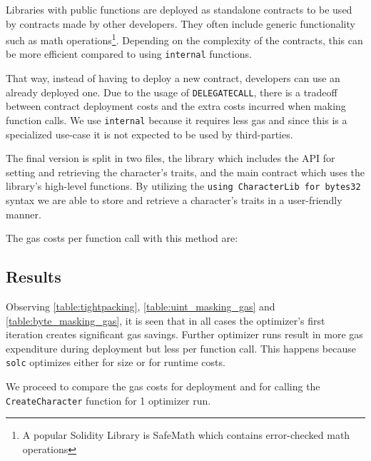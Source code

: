 
Libraries with public functions are deployed as standalone contracts to be used by contracts made by other developers. They often include generic functionality such as math operations\footnote{A popular Solidity Library is SafeMath which contains error-checked math operations}. Depending on the complexity of the contracts, this can be more efficient compared to using \texttt{internal} functions. %

That way, instead of having to deploy a new contract, developers can use an already deployed one. Due to the usage of \texttt{DELEGATECALL}, there is a tradeoff between contract deployment costs and the extra costs incurred when making function calls. We use \texttt{internal} because it requires less gas and since this is a specialized use-case it is not expected to be used by third-parties.

The final version is split in two files, the library which includes the API for setting and retrieving the character's traits, and the main contract which uses the library's high-level functions. By utilizing the \texttt{using CharacterLib for bytes32} syntax we are able to store and retrieve a character's traits in a user-friendly manner.

The gas costs per function call with this method are: 


\subsection{Results}\label{ch:scalability:results}
Observing \ref{table:tightpacking}, \ref{table:uint_masking_gas} and \ref{table:byte_masking_gas},  it is seen that in all cases the optimizer's first iteration creates significant gas savings. Further optimizer runs result in more gas expenditure during deployment but less per function call. This happens because \texttt{solc} optimizes either for size or for runtime costs\cite{optimizer-tradeoff}. 

We proceed to compare the gas costs for deployment and for calling the \texttt{CreateCharacter} function for 1 optimizer run.

